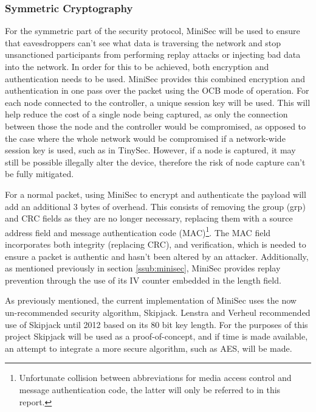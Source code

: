 \documentclass{mprop}
\begin{document}
\subsubsection{Symmetric Cryptography} %
\label{ssub:symmetric_key_cryptography}
For the symmetric part of the security protocol, MiniSec\cite{MiniSec} will be used to ensure that eavesdroppers can't see what data is traversing the network and stop unsanctioned participants from performing replay attacks or injecting bad data into the network. In order for this to be achieved, both encryption and authentication needs to be used. MiniSec provides this combined encryption and authentication in one pass over the packet using the OCB mode of operation. For each node connected to the controller, a unique session key will be used. This will help reduce the cost of a single node being captured, as only the connection between those the node and the controller would be compromised, as opposed to the case where the whole network would be compromised if a network-wide session key is used, such as in TinySec\cite{TinySec}. However, if a node is captured, it may still be possible illegally alter the device, therefore the risk of node capture can't be fully mitigated.

For a normal packet, using MiniSec to encrypt and authenticate the payload will add an additional 3 bytes of overhead. This consists of removing the group (grp) and CRC fields as they are no longer necessary, replacing them with a source address field and message authentication code (MAC)\footnote{Unfortunate collision between abbreviations for media access control and message authentication code, the latter will only be referred to in this report.}. The MAC field incorporates both integrity (replacing CRC), and verification, which is needed to ensure a packet is authentic and hasn't been altered by an attacker. Additionally, as mentioned previously in section \ref{ssub:minisec}, MiniSec provides replay prevention through the use of its IV counter embedded in the length field.

As previously mentioned, the current implementation of MiniSec uses the now un-recommended security algorithm, Skipjack. Lenstra and Verheul recommended use of Skipjack until 2012 based on its 80 bit key length\cite{SkipjackRecommendation}. For the purposes of this project Skipjack will be used as a proof-of-concept, and if time is made available, an attempt to integrate a more secure algorithm, such as AES, will be made.

\end{document}
